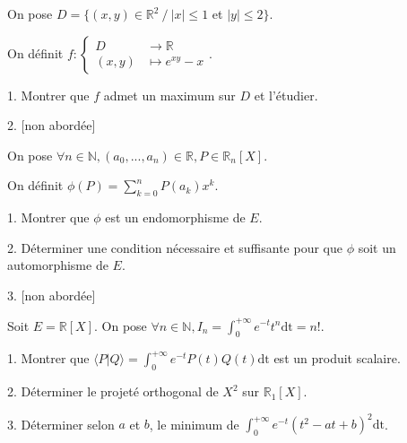 \subetoiles



\noindent On pose $D = \{ (x,y) \in \mathbb{R}^2 \ / \ |x|  \leqslant 1$ et $|y| \leqslant 2 \}$.

\vspace{5pt}
\noindent On définit $f :
\begin{cases}
  D & \longrightarrow \mathbb{R} \\
  (x,y) & \mapsto e^{xy} - x
\end{cases}
$.

\vspace{5pt}
1. Montrer que $f$ admet un maximum sur $D$ et l'étudier.

\vspace{5pt}
2. [non abordée]



\subetoiles



\noindent On pose $\forall n \in \mathbb{N}, (a_0, ..., a_n) \in \mathbb{R}, P \in \mathbb{R}_n[X]$.

\vspace{5pt}
\noindent On définit $\displaystyle \phi(P) = \sum_{k=0}^{n} P(a_k)x^k$.

\vspace{5pt}
1. Montrer que $\phi$ est un endomorphisme de $E$.

\vspace{5pt}
2. Déterminer une condition nécessaire et suffisante pour que $\phi$ soit un \\   automorphisme de $E$.

\vspace{5pt}
3. [non abordée]



\subetoiles



\noindent Soit $E = \mathbb{R}[X]$. On pose
$\displaystyle \forall n \in \mathbb{N}, I_n = \int_{0}^{+\infty} e^{-t}t^n\mathrm{dt} = n!$.

\vspace{5pt}
1. Montrer que $\displaystyle \langle P|Q \rangle = \int_{0}^{+\infty} e^{-t}P(t)Q(t)\mathrm{dt}$ est un produit scalaire.

\vspace{5pt}
2. Déterminer le projeté orthogonal de $X^2$ sur $\mathbb{R}_1[X]$.

\vspace{5pt}
3. Déterminer selon $a$ et $b$, le minimum de $\displaystyle \int_{0}^{+\infty}e^{-t}(t^2-at+b)^2\mathrm{dt}$.



